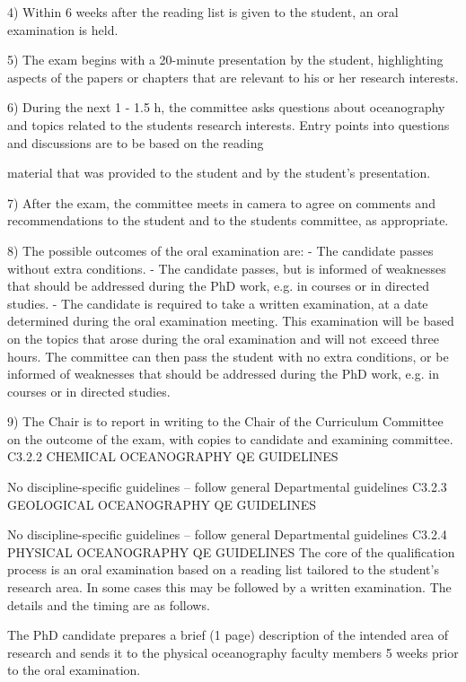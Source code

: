4)	Within 6 weeks after the reading list is given to the student, an oral examination is held.

5)	The exam begins with a 20-minute presentation by the student, highlighting aspects of the papers or chapters that are relevant to his or her research interests.

6)	During the next 1 - 1.5 h, the committee asks questions about oceanography and topics related to the students research interests. Entry points into questions and discussions are to be based on the reading
 

material that was provided to the student and by the student’s presentation.

7)	After the exam, the committee meets in camera to agree on comments and recommendations to the student and to the students committee, as appropriate.

8)	The possible outcomes of the oral examination are:
-	The candidate passes without extra conditions.
-	The candidate passes, but is informed of weaknesses that should be addressed during the PhD work,
e.g. in courses or in directed studies.
-	The candidate is required to take a written examination, at a date determined during the oral examination meeting. This examination will be based on the topics that arose during the oral examination and will not exceed three hours. The committee can then pass the student with no extra conditions, or be informed of weaknesses that should be addressed during the PhD work, e.g. in courses or in directed studies.

9)	The Chair is to report in writing to the Chair of the Curriculum Committee on the outcome of the exam, with copies to candidate and examining committee.
C3.2.2  CHEMICAL OCEANOGRAPHY QE GUIDELINES

No discipline-specific guidelines – follow general Departmental guidelines
C3.2.3  GEOLOGICAL OCEANOGRAPHY QE GUIDELINES

No discipline-specific guidelines – follow general Departmental guidelines
C3.2.4  PHYSICAL OCEANOGRAPHY QE GUIDELINES
The core of the qualification process is an oral examination based on a reading list tailored to the student’s research area. In some cases this may be followed by a written examination. The details and the timing are as follows.

The PhD candidate prepares a brief (1 page) description of the intended area of research and sends it to the physical oceanography faculty members 5 weeks prior to the oral examination.

